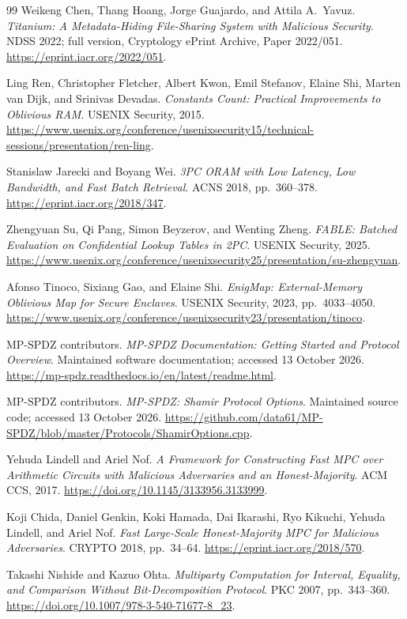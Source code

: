 \documentclass[11pt]{article}
\begin{document}
\begin{thebibliography}{99}
Weikeng Chen, Thang Hoang, Jorge Guajardo, and Attila A.~Yavuz.
\emph{Titanium: A Metadata-Hiding File-Sharing System with Malicious Security}.
NDSS 2022; full version, Cryptology ePrint Archive, Paper 2022/051.
\url{https://eprint.iacr.org/2022/051}.

Ling Ren, Christopher Fletcher, Albert Kwon, Emil Stefanov, Elaine Shi, Marten van Dijk, and Srinivas Devadas.
\emph{Constants Count: Practical Improvements to Oblivious RAM}.
USENIX Security, 2015.
\url{https://www.usenix.org/conference/usenixsecurity15/technical-sessions/presentation/ren-ling}.

Stanislaw Jarecki and Boyang Wei.
\emph{3PC ORAM with Low Latency, Low Bandwidth, and Fast Batch Retrieval}.
ACNS 2018, pp.~360--378.
\url{https://eprint.iacr.org/2018/347}.

Zhengyuan Su, Qi Pang, Simon Beyzerov, and Wenting Zheng.
\emph{FABLE: Batched Evaluation on Confidential Lookup Tables in 2PC}.
USENIX Security, 2025.
\url{https://www.usenix.org/conference/usenixsecurity25/presentation/su-zhengyuan}.

Afonso Tinoco, Sixiang Gao, and Elaine Shi.
\emph{EnigMap: External-Memory Oblivious Map for Secure Enclaves}.
USENIX Security, 2023, pp.~4033--4050.
\url{https://www.usenix.org/conference/usenixsecurity23/presentation/tinoco}.

MP-SPDZ contributors.
\emph{MP-SPDZ Documentation: Getting Started and Protocol Overview}.
Maintained software documentation; accessed 13 October 2026.
\url{https://mp-spdz.readthedocs.io/en/latest/readme.html}.

MP-SPDZ contributors.
\emph{MP-SPDZ: Shamir Protocol Options}.
Maintained source code; accessed 13 October 2026.
\url{https://github.com/data61/MP-SPDZ/blob/master/Protocols/ShamirOptions.cpp}.

Yehuda Lindell and Ariel Nof.
\emph{A Framework for Constructing Fast MPC over Arithmetic Circuits with Malicious Adversaries and an Honest-Majority}.
ACM CCS, 2017.
\url{https://doi.org/10.1145/3133956.3133999}.

Koji Chida, Daniel Genkin, Koki Hamada, Dai Ikarashi, Ryo Kikuchi, Yehuda Lindell, and Ariel Nof.
\emph{Fast Large-Scale Honest-Majority MPC for Malicious Adversaries}.
CRYPTO 2018, pp.~34--64.
\url{https://eprint.iacr.org/2018/570}.

Takashi Nishide and Kazuo Ohta.
\emph{Multiparty Computation for Interval, Equality, and Comparison Without Bit-Decomposition Protocol}.
PKC 2007, pp.~343--360.
\url{https://doi.org/10.1007/978-3-540-71677-8_23}.


\end{thebibliography}
\end{document}
